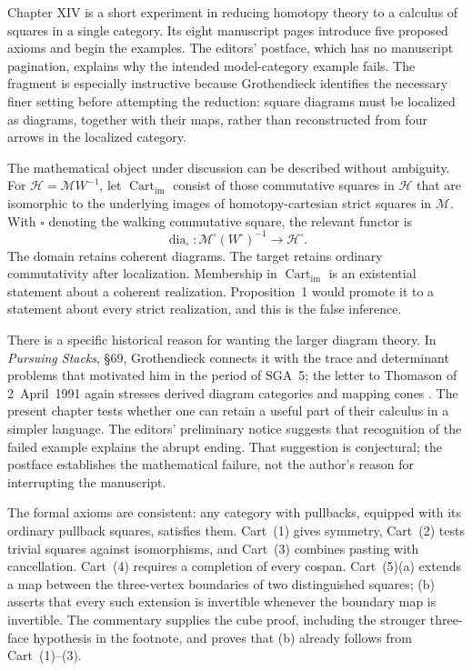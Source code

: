 Chapter XIV is a short experiment in reducing homotopy theory to a calculus of squares in a single category. Its eight manuscript pages introduce five proposed axioms and begin the examples. The editors' postface, which has no manuscript pagination, explains why the intended model-category example fails. The fragment is especially instructive because Grothendieck identifies the necessary finer setting before attempting the reduction: square diagrams must be localized as diagrams, together with their maps, rather than reconstructed from four arrows in the localized category.

The mathematical object under discussion can be described without ambiguity. For $\mathcal H=\mathcal MW^{-1}$, let $\operatorname{Cart}_{\mathrm{im}}$ consist of those commutative squares in $\mathcal H$ that are isomorphic to the underlying images of homotopy-cartesian strict squares in $\mathcal M$. With $\square$ denoting the walking commutative square, the relevant functor is
\[
\operatorname{dia}_{\square}:
\mathcal M^{\square}(W^{\square})^{-1}
\longrightarrow\mathcal H^{\square}.
\]
The domain retains coherent diagrams. The target retains ordinary commutativity after localization. Membership in $\operatorname{Cart}_{\mathrm{im}}$ is an existential statement about a coherent realization. Proposition~1 would promote it to a statement about every strict realization, and this is the false inference.

There is a specific historical reason for wanting the larger diagram theory. In \emph{Pursuing Stacks}, \S69, Grothendieck connects it with the trace and determinant problems that motivated him in the period of SGA~5; the letter to Thomason of 2~April~1991 again stresses derived diagram categories and mapping cones \citep{Grothendieck1983,Grothendieck1991Letter}. The present chapter tests whether one can retain a useful part of their calculus in a simpler language. The editors' preliminary notice suggests that recognition of the failed example explains the abrupt ending. That suggestion is conjectural; the postface establishes the mathematical failure, not the author's reason for interrupting the manuscript.

The formal axioms are consistent: any category with pullbacks, equipped with its ordinary pullback squares, satisfies them. Cart~(1) gives symmetry, Cart~(2) tests trivial squares against isomorphisms, and Cart~(3) combines pasting with cancellation. Cart~(4) requires a completion of every cospan. Cart~(5)(a) extends a map between the three-vertex boundaries of two distinguished squares; (b) asserts that every such extension is invertible whenever the boundary map is invertible. The commentary supplies the cube proof, including the stronger three-face hypothesis in the footnote, and proves that (b) already follows from Cart~(1)--(3).

